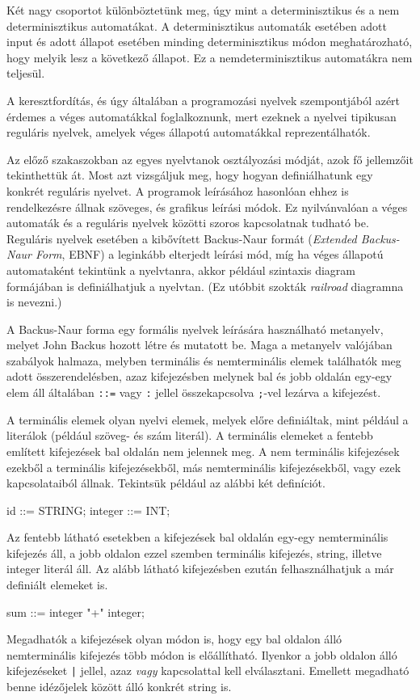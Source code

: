 Két nagy csoportot különböztetünk meg, úgy mint a determinisztikus és a nem determinisztikus automatákat.
A determinisztikus automaták esetében adott input és adott állapot esetében minding determinisztikus módon meghatározható, hogy melyik lesz a következő állapot. Ez a nemdeterminisztikus automatákra nem teljesül.

A keresztfordítás, és úgy általában a programozási nyelvek szempontjából azért érdemes a véges automatákkal foglalkoznunk, mert ezeknek a nyelvei tipikusan reguláris nyelvek, amelyek véges állapotú automatákkal reprezentálhatók.


Az előző szakaszokban az egyes nyelvtanok osztályozási módját, azok fő jellemzőit tekinthettük át.
Most azt vizsgáljuk meg, hogy hogyan definiálhatunk egy konkrét reguláris nyelvet.
A programok leírásához hasonlóan ehhez is rendelkezésre állnak szöveges, és grafikus leírási módok.
Ez nyilvánvalóan a véges automaták és a reguláris nyelvek közötti szoros kapcsolatnak tudható be.
Reguláris nyelvek esetében a kibővített Backus-Naur formát (\textit{Extended Backus-Naur Form}, EBNF) a leginkább elterjedt leírási mód, míg ha véges állapotú automataként tekintünk a nyelvtanra, akkor például szintaxis diagram formájában is definiálhatjuk a nyelvtan. (Ez utóbbit szokták \textit{railroad} diagramna is nevezni.)


A Backus-Naur forma egy formális nyelvek leírására használható metanyelv, melyet John Backus hozott létre és mutatott be. Maga a metanyelv valójában szabályok halmaza, melyben terminális és nemterminális elemek találhatók meg adott összerendelésben, azaz kifejezésben melynek bal és jobb oldalán egy-egy elem áll általában \texttt{::=} vagy \texttt{:} jellel összekapcsolva \texttt{;}-vel lezárva a kifejezést.

A terminális elemek olyan nyelvi elemek, melyek előre definiáltak, mint például a literálok (például szöveg- és szám literál).
A terminális elemeket a fentebb említett kifejezések bal oldalán nem jelennek meg.
A nem terminális kifejezések ezekből a terminális kifejezésekből, más nemterminális kifejezésekből, vagy ezek kapcsolataiból állnak. Tekintsük például az alábbi két definíciót.
\begin{cpp}
id ::= STRING;
integer ::= INT;
\end{cpp}
Az fentebb látható esetekben a kifejezések bal oldalán egy-egy nemterminális kifejezés áll, a jobb oldalon ezzel szemben terminális kifejezés, string, illetve integer literál áll. Az alább látható kifejezésben ezután felhasználhatjuk a már definiált elemeket is.
\begin{cpp}
sum ::=	integer "+" integer;
\end{cpp}
Megadhatók a kifejezések olyan módon is, hogy egy bal oldalon álló nemterminális kifejezés több módon is előállítható. Ilyenkor a jobb oldalon álló kifejezéseket \texttt{|} jellel, azaz \textit{vagy} kapcsolattal kell elválasztani. Emellett megadható benne idézőjelek között álló konkrét string is.

